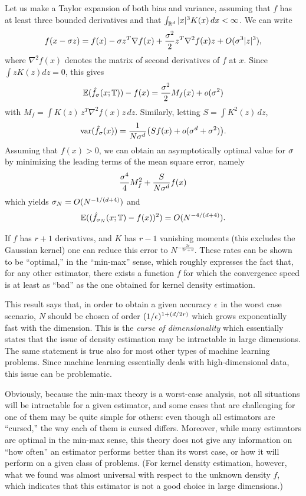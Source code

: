Let us make a
Taylor expansion of both bias and variance, assuming that $f$ has at least three bounded derivatives and that $\int_{{\mathbb{R}}^d} |x|^3 K(x) \,dx < \infty$.
We can write
$$
f(x-\sigma z) = f(x) - \sigma z^T \nabla f(x) + \frac{\sigma^2}{2} z^T \nabla^2f(x) z +
O(\sigma^3|z|^3),
$$ 
where $\nabla^2f(x)$ denotes the matrix of second derivatives of $f$ at $x$.
Since $\int zK(z) dz = 0$, this gives
$$
\bm{\mathbb E}({\hat{f}}_\sigma(x;{\mathbb T})) - f(x) = \frac{\sigma^2}{2} M_f (x) + o(\sigma^2)
$$
with $M_f = \int K(z)\, z^T \nabla^2f(x) z\, dz$. Similarly, letting $S = \int K^2(z) \, dz$,
$$
\mathrm{var}({\hat{f}}_\sigma(x)) = \frac{1}{N\sigma^d} \big(S f(x) +  o(\sigma^d + \sigma^2)\big).
$$
Assuming that $f(x)>0$, we can obtain an asymptotically optimal value for
$\sigma$ by minimizing the leading terms of the mean square error, namely
$$
\frac{\sigma^4}{4} M^2_f  + \frac{S}{N\sigma^d} f(x)
$$
which yields $\sigma_N = O(N^{-1/(d+4)})$ and 
$$
\bm{\mathbb E}(({\hat{f}}_{\sigma_N}(x; {\mathbb T}) - f(x))^2) = O(N^{-4/(d+4)}).
$$

If $f$ has $r+1$
derivatives, and $K$ has $r-1$ vanishing moments
(this excludes the Gaussian kernel) one can reduce this error to  $N^{- \frac{2r}{2r+d}}$.  These rates can be shown to be
``optimal,'' in the ``min-max'' sense, which roughly expresses the fact that,  for any other
estimator, there exists a function $f$ for which the convergence speed
is at least as ``bad'' as the one obtained for kernel density estimation.
\bigskip

This result  says that, in order to obtain a
given accuracy $\epsilon$ in the worst case scenario, $N$ should be chosen of order $(1/\epsilon)^{1 + (d/2r)}$
which grows exponentially fast with the dimension. This is the {\em
curse of dimensionality} which essentially states that the issue of
density estimation may be intractable in large dimensions. The
same statement is true also for  most other types of machine learning problems. Since machine learning essentially deals with high-dimensional data, this issue can be problematic. 

Obviously, because the min-max theory is a worst-case analysis, not all situations will be intractable for a given estimator, and some cases that are challenging for one of them may be quite simple for others: even though all estimators are ``cursed,'' the way each of them is cursed differs. Moreover, while many estimators are optimal in the min-max sense, this theory does not give any information on ``how often''  an estimator performs better than its worst case, or how it will perform on a given class of problems. (For kernel density estimation, however, what we found was almost universal with respect to the unknown density $f$, which indicates that this estimator is not a good choice in large dimensions.)

